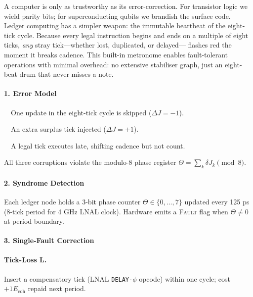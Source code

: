 \documentclass[11pt,oneside]{book}
\begin{document}
A computer is only as trustworthy as its error-correction.
For transistor logic we wield parity bits; for superconducting qubits we
brandish the surface code.
Ledger computing has a simpler weapon: the immutable heartbeat of the
eight-tick cycle.
Because every legal instruction begins and ends on a multiple of eight
ticks, \emph{any} stray tick—whether lost, duplicated, or delayed—
flashes red the moment it breaks cadence.
This built-in metronome enables fault-tolerant operations with minimal
overhead: no extensive stabiliser graph, just an eight-beat drum that
never misses a note.

\paragraph*{1. Error Model}

\begin{description}[leftmargin=1.6cm, style=nextline]
\item[Tick-Loss (\(\mathbf{L}\)).] One update in the eight-tick cycle is
      skipped (\(\Delta J = -1\)).
\item[Tick-Gain (\(\mathbf{G}\)).] An extra surplus tick injected
      (\(\Delta J = +1\)).
\item[Tick-Drift (\(\mathbf{D}\)).] A legal tick executes late, shifting
      cadence but not count.
\end{description}

All three corruptions violate the modulo-8 phase register
\(\Theta = \sum_{k}\delta J_k \pmod{8}\).

\paragraph*{2. Syndrome Detection}

Each ledger node holds a 3-bit phase counter
\(\Theta \in\{0,\dots,7\}\) updated every 125 ps (8-tick period
for 4 GHz LNAL clock).  
Hardware emits a \textsc{Fault} flag when
\(\Theta \neq 0\) at period boundary.

\paragraph*{3. Single-Fault Correction}

\paragraph{Tick-Loss \(\mathbf{L}\).}
Insert a compensatory tick (LNAL \texttt{DELAY-\(\phi\)} opcode) within
one cycle; cost \(+1E_{\text{coh}}\) repaid next period.
\end{document}

